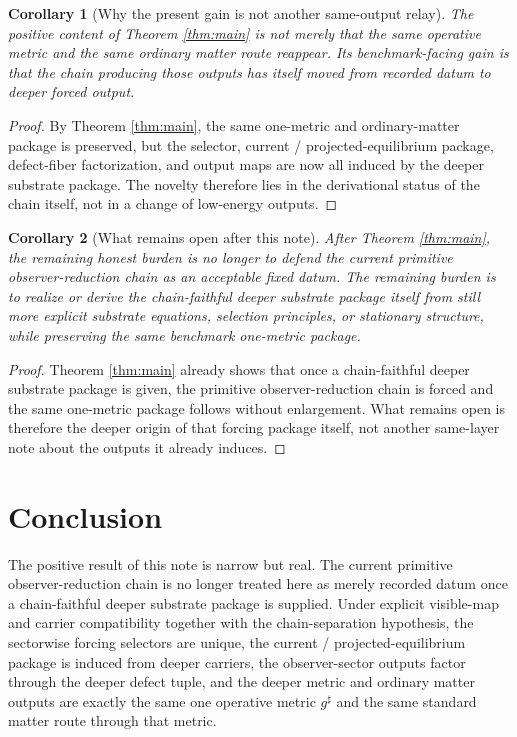 \documentclass[11pt]{article}
\newcommand{\CompletedMetric}{g^{\sharp}}
\newtheorem{corollary}{Corollary}
\begin{document}
\begin{corollary}[Why the present gain is not another same-output relay]
\label{cor:notrelay}
The positive content of Theorem \ref{thm:main} is not merely that the same operative metric and the same ordinary matter route reappear. Its benchmark-facing gain is that the chain producing those outputs has itself moved from recorded datum to deeper forced output.
\end{corollary}

\begin{proof}
By Theorem \ref{thm:main}, the same one-metric and ordinary-matter package is preserved, but the selector, current / projected-equilibrium package, defect-fiber factorization, and output maps are now all induced by the deeper substrate package. The novelty therefore lies in the derivational status of the chain itself, not in a change of low-energy outputs.
\end{proof}

\begin{corollary}[What remains open after this note]
\label{cor:next}
After Theorem \ref{thm:main}, the remaining honest burden is no longer to defend the current primitive observer-reduction chain as an acceptable fixed datum. The remaining burden is to realize or derive the chain-faithful deeper substrate package itself from still more explicit substrate equations, selection principles, or stationary structure, while preserving the same benchmark one-metric package.
\end{corollary}

\begin{proof}
Theorem \ref{thm:main} already shows that once a chain-faithful deeper substrate package is given, the primitive observer-reduction chain is forced and the same one-metric package follows without enlargement. What remains open is therefore the deeper origin of that forcing package itself, not another same-layer note about the outputs it already induces.
\end{proof}

\section{Conclusion}

The positive result of this note is narrow but real. The current primitive observer-reduction chain is no longer treated here as merely recorded datum once a chain-faithful deeper substrate package is supplied. Under explicit visible-map and carrier compatibility together with the chain-separation hypothesis, the sectorwise forcing selectors are unique, the current / projected-equilibrium package is induced from deeper carriers, the observer-sector outputs factor through the deeper defect tuple, and the deeper metric and ordinary matter outputs are exactly the same one operative metric \(\CompletedMetric\) and the same standard matter route through that metric.
\end{document}
